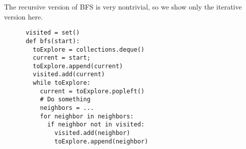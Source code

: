 \documentclass{article}
\begin{document}
  \begin{definition}[BFS]
    The recursive version of BFS is very nontrivial, so we show only the iterative version here. 
    \begin{lstlisting}
      visited = set() 
      def bfs(start): 
        toExplore = collections.deque() 
        current = start; 
        toExplore.append(current) 
        visited.add(current) 
        while toExplore: 
          current = toExplore.popleft() 
          # Do something 
          neighbors = ... 
          for neighbor in neighbors: 
            if neighbor not in visited: 
              visited.add(neighbor) 
              toExplore.append(neighbor)
    \end{lstlisting}
  \end{definition}
\end{document}
